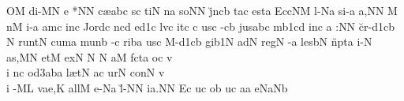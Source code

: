 
\Internote
{}
\initiumgregorianum
{}%
\sgn {}O{}\punctum M\egn
\sgn di-\pes MN\egn
\sgn {}e{ *}\punctum N\augmentum N\egn
\spatium\divisiominima\spatium
\sgn c{\ae }{}\Salicus abc\egn
{}s\punctum c\egn
\sgn ti{}\punctum N\egn
\spatium
{}n\punctum a\egn
\sgn so{}\punctum N\augmentum N\egn
\spatium
\sgn j{\u}{nc}\punctum b\egn
\sgn ta{}\punctum c\egn
\spatium
\sgn {}e{st}\punctum a\egn
\spatium
\sgn {}E{cc}\clivis NM\egn
\sgn l{\e}-\pes Na\egn
\sgn si-\punctum a\egn
\sgn {}a,\punctum N\augmentum N\egn
\spatium\divisiominor\custos M\lineaproxima
{}n\punctum M\egn
\sgn {}i-\punctum a\egn
\sgn {}am\punctum c\egn
\spatium
\sgn {}in\punctum c\egn
\spatium
\sgn Jo{rd}\punctum c\egn
\sgn {}{\a}n\pes cd\egn
\sgn {}e{}\episem d1\punctum c\egn
\spatium\divisiominima\spatium
\sgn l{\a}v\punctum c\egn
\sgn {}it\punctum c\egn
\spatium
{}\punctum c\egn
\sgn {}us\punctum c\egn
\spatium
\sgn {}{\e}-\clivis cb\egn
\sgn jus\Salicus abc\egn
\spatium
{}m\episem b1\pes cd\egn
\sgn {}in\punctum c\egn
\sgn {}a{  :}\punctum N\augmentum N\egn
\spatium\divisiomaior\spatium
\sgn c{\u}{r-}\episem d1\clivis cb\egn
\spatium\custos N\lineaproxima
\sgn ru{nt}\punctum N\egn
\spatium
\sgn cum\punctum a\egn
\spatium
\sgn mun\punctum b\egn
\sgn {}{\e}-\punctum c\egn
\sgn rib\punctum a\egn
\sgn {}us\punctum c\egn
\spatium
\sgn M{\a}-\episem d1\clivis cb\egn
\sgn gi{}\episem b1\punctum N\egn
\spatium\divisiominima\spatium
\sgn {}ad\punctum N\egn
\spatium
\sgn reg\punctum N\egn
\sgn {}{\a}-\punctum a\egn
\sgn les\clivis bN\egn
\spatium
\sgn n{\u}{pt}\punctum a\egn
\sgn {}i-\punctum N\egn
\sgn {}a{s,}\punctum M\augmentum N\egn
\spatium\divisiominor\spatium
\sgn {}et\punctum M\egn
\spatium
\sgn {}ex\punctum N\egn
\spatium\custos N\lineaproxima
{}\punctum N\egn
\sgn {}a{}\punctum M\egn
\spatium
\sgn f{\a}{ct}\punctum a\egn 
\sgn {}o{}\punctum c\egn
\spatium
\sgn v{\\i }n\punctum c\egn
\sgn {}o{}\episem d3\torculus aba\egn
\spatium\divisiominima\spatium
\sgn l{\ae }t\punctum N\egn
{}\pes ac\egn
\sgn {}ur\punctum N\egn
\spatium
\sgn con\punctum N\egn
\sgn v{\\i }-\clivis ML\egn
\sgn va{e,}\punctum K\egn
\spatium
\sgn {}a{ll}\punctum M\egn
\sgn {}e-\pes Na\egn
\sgn l{\u}-\punctum N\augmentum N\egn
\sgn ia.\punctum N\augmentum N\egn
\spatium\divisiofinalis\spatium
\sgn {}E{}\punctum c\egn
\spatium
\sgn {}u{}\punctum c\egn
\spatium
\sgn {}o{}\punctum b\egn
\spatium
\sgn {}u{}\punctum c\egn
\spatium
\sgn {}a{}\punctum a\egn
\spatium
\sgn {}e{}\pes Na\augmentumduplex Nb\egn
\spatium
\setemptybar
\Finisgregoriana